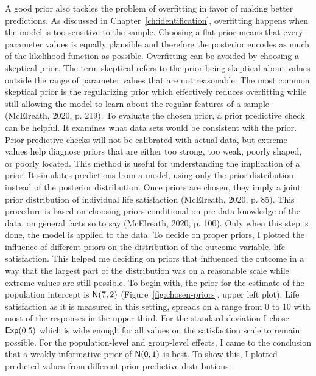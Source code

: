 \documentclass[a4, 12pt]{article}
\begin{document}
A good prior also tackles the problem of overfitting in favor of making better predictions. As discussed in Chapter~\ref{ch:identification}, overfitting happens when the model is too sensitive to the sample. Choosing a flat prior means that every parameter values is equally plausible and therefore the posterior encodes as much of the likelihood function as possible. Overfitting can be avoided by choosing a skeptical prior. The term skeptical refers to the prior being skeptical about values outside the range of parameter values that are not reasonable. The most common skeptical prior is the regularizing prior which effectively reduces overfitting while still allowing the model to learn about the regular features of a sample (McElreath, 2020, p. 219).
To evaluate the chosen prior, a prior predictive check can be helpful. It examines what data sets would be consistent with the prior. Prior predictive checks will not be calibrated with actual data, but extreme values help diagnose priors that are either too strong, too weak, poorly shaped, or poorly located. This method is useful for understanding the implication of a prior. It simulates predictions from a model, using only the prior distribution instead of the posterior distribution. Once priors are chosen, they imply a joint prior distribution of individual life satisfaction (McElreath, 2020, p. 85). This procedure is based on choosing priors conditional on pre-data knowledge of the data, on general facts so to say (McElreath, 2020, p. 100). Only when this step is done, the model is applied to the data.
To decide on proper priors, I plotted the influence of different priors on the distribution of the outcome variable, life satisfaction. This helped me deciding on priors that influenced the outcome in a way that the largest part of the distribution was on a reasonable scale while extreme values are still possible. To begin with, the prior for the estimate of the population intercept is \({\sf N}(7,2)\) (Figure~\ref{fig:chosen-priors}, upper left plot). Life satisfaction as it is measured in this setting, spreads on a range from 0 to 10 with most of the responses in the upper third. For the standard deviation I chose \({\sf Exp}(0.5)\) which is wide enough for all values on the satisfaction scale to remain possible. For the population-level and group-level effects, I came to the conclusion that a weakly-informative prior of \(\sf {N}(0,1)\) is best. To show this, I plotted predicted values from different prior predictive distributions:
\end{document}
